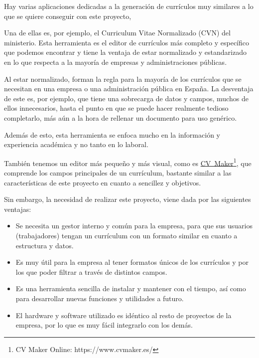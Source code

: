 
Hay varias aplicaciones dedicadas a la generación de currículos muy similares a lo que se quiere conseguir con este proyecto,

Una de ellas es, por ejemplo, el Curriculum Vitae Normalizado (CVN) del ministerio. Esta herramienta es el editor de currículos más completo y específico que podemos encontrar y tiene la ventaja de estar normalizado y estandarizado en lo que respecta a la mayoría de empresas y administraciones públicas. 

Al estar normalizado, forman la regla para la mayoría de los currículos que se necesitan en una empresa o una administración pública en España. La desventaja de este es, por ejemplo, que tiene una sobrecarga de datos y campos, muchos de ellos innecesarios, hasta el punto en que se puede hacer realmente tedioso completarlo, más aún a la hora de rellenar un documento para uso genérico. 

Además de esto, esta herramienta se enfoca mucho en la información y experiencia académica y no tanto en lo laboral.

También tenemos un editor más pequeño y más visual, como es \href{https://www.cvmaker.es/}{\mbox{CV Maker}}\footnote{CV Maker Online: https://www.cvmaker.es/}, que comprende los campos principales de un currículum, bastante similar a las características de este proyecto en cuanto a sencillez y objetivos.

Sin embargo, la necesidad de realizar este proyecto, viene dada por las siguientes ventajas:
\begin{itemize}
 \item Se necesita un gestor interno y común para la empresa, para que sus usuarios (trabajadores) tengan un currículum con un formato similar en cuanto a estructura y datos.
 \item Es muy útil para la empresa al tener formatos únicos de los currículos y por los que poder filtrar a través de distintos campos.
 \item Es una herramienta sencilla de instalar y mantener con el tiempo, así como para desarrollar nuevas funciones y utilidades a futuro.
 \item El hardware y software utilizado es idéntico al resto de proyectos de la empresa, por lo que es muy fácil integrarlo con los demás.
\end{itemize}
